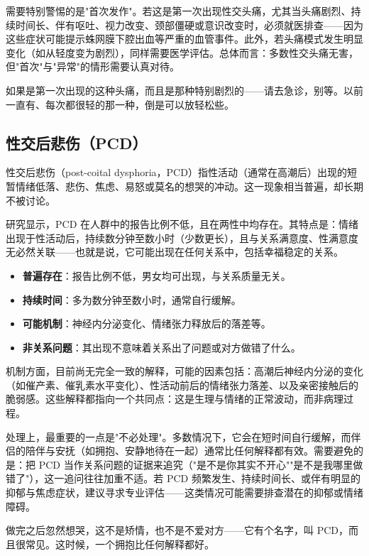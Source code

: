 \documentclass[12pt,UTF8]{ctexbook}
\newcommand{\keyword}[1]{\textbf{#1}}
\begin{document}
需要特别警惕的是"首次发作"。若这是第一次出现性交头痛，尤其当头痛剧烈、持续时间长、伴有呕吐、视力改变、颈部僵硬或意识改变时，必须就医排查——因为这些症状可能提示蛛网膜下腔出血等严重的血管事件。此外，若头痛模式发生明显变化（如从轻度变为剧烈），同样需要医学评估。总体而言：多数性交头痛无害，但"首次"与"异常"的情形需要认真对待。

\begin{tcolorbox}[colback=pink!5!white,colframe=red!50!black,title=贴心小叮咛]
如果是第一次出现的这种头痛，而且是那种特别剧烈的——请去急诊，别等。以前一直有、每次都很轻的那一种，倒是可以放轻松些。
\end{tcolorbox}
\subsection{性交后悲伤（PCD）}

性交后悲伤（post-coital dysphoria，PCD）指性活动（通常在高潮后）出现的短暂情绪低落、悲伤、焦虑、易怒或莫名的想哭的冲动。这一现象相当普遍，却长期不被讨论。

研究显示，PCD 在人群中的报告比例不低，且在两性中均存在。其特点是：情绪出现于性活动后，持续数分钟至数小时（少数更长），且与关系满意度、性满意度无必然关联——也就是说，它可能出现在任何关系中，包括幸福稳定的关系。

\begin{itemize}
  \item \keyword{普遍存在}：报告比例不低，男女均可出现，与关系质量无关。
  \item \keyword{持续时间}：多为数分钟至数小时，通常自行缓解。
  \item \keyword{可能机制}：神经内分泌变化、情绪张力释放后的落差等。
  \item \keyword{非关系问题}：其出现不意味着关系出了问题或对方做错了什么。
\end{itemize}

机制方面，目前尚无完全一致的解释，可能的因素包括：高潮后神经内分泌的变化（如催产素、催乳素水平变化）、性活动前后的情绪张力落差、以及亲密接触后的脆弱感。这些解释都指向一个共同点：这是生理与情绪的正常波动，而非病理过程。

处理上，最重要的一点是"不必处理"。多数情况下，它会在短时间自行缓解，而伴侣的陪伴与安抚（如拥抱、安静地待在一起）通常比任何解释都有效。需要避免的是：把 PCD 当作关系问题的证据来追究（"是不是你其实不开心""是不是我哪里做错了"），这一追问往往加重不适。若 PCD 频繁发生、持续时间长、或伴有明显的抑郁与焦虑症状，建议寻求专业评估——这类情况可能需要排查潜在的抑郁或情绪障碍。

\begin{tcolorbox}[colback=pink!5!white,colframe=red!50!black,title=贴心小叮咛]
做完之后忽然想哭，这不是矫情，也不是不爱对方——它有个名字，叫 PCD，而且很常见。这时候，一个拥抱比任何解释都好。
\end{tcolorbox}
\end{document}
